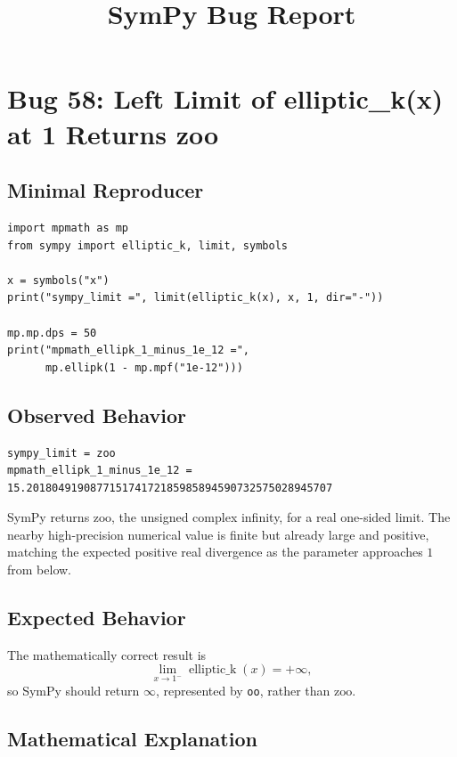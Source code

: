 \documentclass[11pt]{article}
\title{SymPy Bug Report}
\author{}
\date{}
\begin{document}
\maketitle

\section{Bug 58: Left Limit of elliptic\_k(x) at 1 Returns zoo}

\subsection{Minimal Reproducer}

\medskip

\begin{lstlisting}[style=bugpython]
import mpmath as mp
from sympy import elliptic_k, limit, symbols

x = symbols("x")
print("sympy_limit =", limit(elliptic_k(x), x, 1, dir="-"))

mp.mp.dps = 50
print("mpmath_ellipk_1_minus_1e_12 =",
      mp.ellipk(1 - mp.mpf("1e-12")))
\end{lstlisting}

\subsection{Observed Behavior}

\medskip

\begin{lstlisting}[style=bugpython]
sympy_limit = zoo
mpmath_ellipk_1_minus_1e_12 = 15.201804919087715174172185985894590732575028945707
\end{lstlisting}

SymPy returns \(\mathrm{zoo}\), the unsigned complex infinity, for a real one-sided limit. The nearby high-precision numerical value is finite but already large and positive, matching the expected positive real divergence as the parameter approaches \(1\) from below.

\subsection{Expected Behavior}

The mathematically correct result is
\[
\lim_{x \to 1^-} \operatorname{elliptic\_k}(x)=+\infty,
\]
so SymPy should return \(\infty\), represented by \texttt{oo}, rather than \(\mathrm{zoo}\).

\subsection{Mathematical Explanation}
\end{document}
